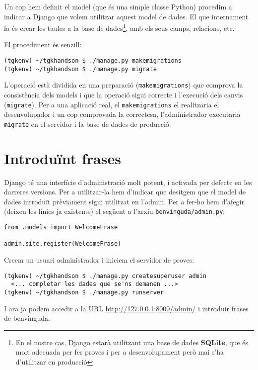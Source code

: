 \documentclass[12pt,a4paper]{article}
\begin{document}
Un cop hem definit el model (que és una simple classe Python) procedim a indicar a Django que volem utilitzar aquest model de dades. El que internament fa és crear les taules a la base de dades\footnote{En el nostre cas, Django estarà utilitzant una base de dades \textbf{SQLite}, que és molt adecuada per fer proves i per a desenvolupament però mai s'ha d'utilitzar en producció}, amb els seus camps, relacions, etc.

El procediment és senzill:

\begin{verbatim}
(tgkenv) ~/tgkhandson $ ./manage.py makemigrations
(tgkenv) ~/tgkhandson $ ./manage.py migrate
\end{verbatim}

L'operació està dividida en una preparació (\verb+makemigrations+) que comprova la consistència dels models i que la operació sigui correcte i l'execució dels canvis (\verb+migrate+). Per a una aplicació real, el \verb+makemigrations+ el realitzaria el desenvolupador i un cop comprovada la correctesa, l'administrador executaria \verb+migrate+ en el servidor i la base de dades de producció.

\section{Introduïnt frases}

Django té una interfície d'administració molt potent, i activada per defecte en les darreres versions. Per a utilitzar-la hem d'indicar que desitgem que el model de dades introduït prèviament sigui utilitzat en l'admin. Per a fer-ho hem d'afegir (deixeu les línies ja existents) el següent a l'arxiu \verb+benvinguda/admin.py+:

\begin{lstlisting}
from .models import WelcomeFrase

admin.site.register(WelcomeFrase)
\end{lstlisting}

Creem un usuari administrador i iniciem el servidor de proves:

\begin{verbatim}
(tgkenv) ~/tgkhandson $ ./manage.py createsuperuser admin
  <... completar les dades que se'ns demanen ...>
(tgkenv) ~/tgkhandson $ ./manage.py runserver
\end{verbatim}

I ara ja podem accedir a la URL \url{http://127.0.0.1:8000/admin/} i introduir frases de benvinguda.
\end{document}
